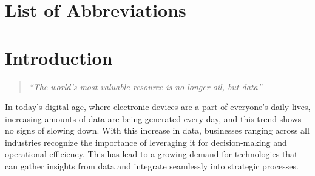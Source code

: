 \documentclass[a4paper,12pt,twoside]{scrreprt}
\begin{document}

\cleardoublepage   %
\tableofcontents

\clearpage
{}
{}
\listoffigures

\clearpage
{}
{}
\listoftables

\clearpage
{}
{}
\chapter*{List of Abbreviations}
\begin{acronym}[WGS84]
\end{acronym}

\chapter{Introduction}

\begin{quote}
  \textit{``The world's most valuable resource is no longer oil, but data''}
  \cite{noauthor_worlds_nodate}
\end{quote}
In today's digital age, where electronic devices are a part of everyone's daily
lives, increasing amounts of data
are being generated every day, and this trend shows no signs of slowing down.
\cite{petroc_data_nodate}
With this increase in data, businesses ranging across all industries recognize
the importance of leveraging it for decision-making and operational efficiency.
This has lead to a growing demand for technologies that can gather insights
from
data and integrate seamlessly into strategic processes.
\end{document}
